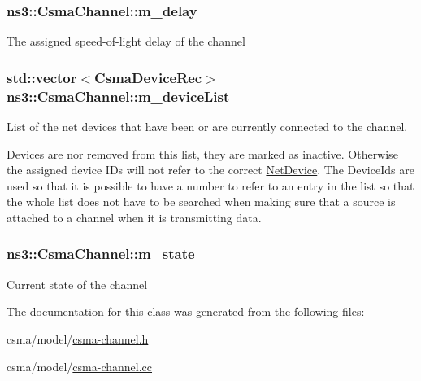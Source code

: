 \subsubsection[{\texorpdfstring{m\+\_\+delay}{m_delay}}]{ ns3\+::\+Csma\+Channel\+::m\+\_\+delay\hspace{0.3cm}{\ttfamily [private]}}\hypertarget{classns3_1_1CsmaChannel_a7289f240118c52453fbac6b9b74ff83e}{}\label{classns3_1_1CsmaChannel_a7289f240118c52453fbac6b9b74ff83e}
The assigned speed-\/of-\/light delay of the channel 
\subsubsection[{\texorpdfstring{m\+\_\+device\+List}{m_deviceList}}]{\setlength{\rightskip}{0pt plus 5cm}std\+::vector$<${\bf Csma\+Device\+Rec}$>$ ns3\+::\+Csma\+Channel\+::m\+\_\+device\+List\hspace{0.3cm}{\ttfamily [private]}}\hypertarget{classns3_1_1CsmaChannel_ac4ee712a3f3f4219c687bf1595f7b1a6}{}\label{classns3_1_1CsmaChannel_ac4ee712a3f3f4219c687bf1595f7b1a6}
List of the net devices that have been or are currently connected to the channel.

Devices are nor removed from this list, they are marked as inactive. Otherwise the assigned device I\+Ds will not refer to the correct \hyperlink{classns3_1_1NetDevice}{Net\+Device}. The Device\+Ids are used so that it is possible to have a number to refer to an entry in the list so that the whole list does not have to be searched when making sure that a source is attached to a channel when it is transmitting data. 
\subsubsection[{\texorpdfstring{m\+\_\+state}{m_state}}]{ ns3\+::\+Csma\+Channel\+::m\+\_\+state\hspace{0.3cm}{\ttfamily [private]}}\hypertarget{classns3_1_1CsmaChannel_a9c0532c38d511b589274e726ad41037f}{}\label{classns3_1_1CsmaChannel_a9c0532c38d511b589274e726ad41037f}
Current state of the channel 

The documentation for this class was generated from the following files\+:\begin{DoxyCompactItemize}
\item 
csma/model/\hyperlink{csma-channel_8h}{csma-\/channel.\+h}\item 
csma/model/\hyperlink{csma-channel_8cc}{csma-\/channel.\+cc}\end{DoxyCompactItemize}
